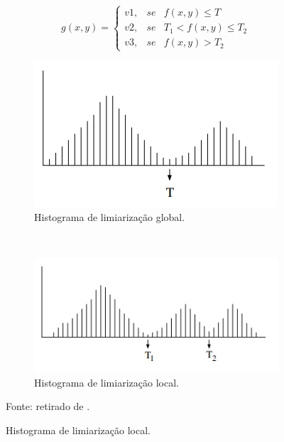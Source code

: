 \begin{equation}
\label{segment:eq:2}
    g(x,y) = \left\{\begin{matrix}
        v1, & se & f(x,y) \leq T \\ 
        v2, & se & T_1 < f(x,y) \leq T_2 \\
        v3, & se & f(x,y) > T_2
\end{matrix}\right.
\end{equation}

\begin{figure}[H]
   \caption{Histogramas de limiarizações.}
   \centering
   \label{segment:fig:2}
    \begin{subfigure}[t]{0.45\textwidth}
        \centering
        \includegraphics[width=0.5\linewidth]{recursos/imagens/image_seg/limi_glob.png}
        \caption{Histograma de limiarização global.}
        \label{segment:fig:2.1}
    \end{subfigure}%
    ~ 
    \begin{subfigure}[t]{0.45\textwidth}
        \centering
        \includegraphics[width=0.5\linewidth]{recursos/imagens/image_seg/limi_local.png}
        \caption{Histograma de limiarização local.}
        \label{segment:fig:2.2}
    \end{subfigure}%

    \vspace*{1 cm}
    Fonte: retirado de \cite{pedrini2008analise}.
\end{figure}

